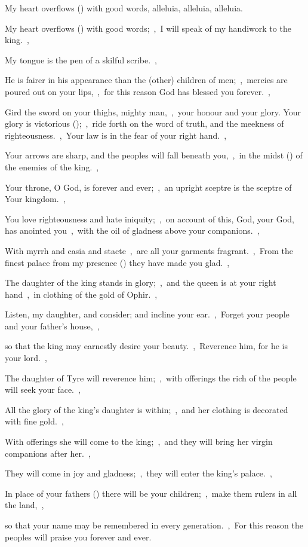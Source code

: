 \documentclass[12pt,twoside,a5paper]{article}
\begin{document}

\begin{halfparskip}
  My heart overflows () with good words, alleluia, alleluia, alleluia.

  My heart overflows () with good words;~\sep\ I will speak of my handiwork to the king.~\sep

  My tongue is the pen of a skilful scribe.~\sep

  He is fairer in his appearance than the (other) children of men;~\sep\ mercies are poured out on your lips,~\sep\ for this reason God has blessed you forever.~\sep

  Gird the sword on your thighs, mighty man,~\sep\ your honour and your glory. Your glory is victorious ();~\sep\ ride forth on the word of truth, and the meekness of righteousness.~\sep\ Your law is in the fear of your right hand.~\sep

  Your arrows are sharp, and the peoples will fall beneath you,~\sep\ in the midst () of the enemies of the king.~\sep

  Your throne, O God, is forever and ever;~\sep\ an upright sceptre is the sceptre of Your kingdom.~\sep

  You love righteousness and hate iniquity;~\sep\ on account of this, God, your God, has anointed you~\sep\ with the oil of gladness above your companions.~\sep

  With myrrh and casia and stacte~\sep\ are all your garments fragrant.~\sep\ From the finest palace from my presence () they have made you glad.~\sep

  The daughter of the king stands in glory;~\sep\ and the queen is at your right hand~\sep\ in clothing of the gold of Ophir.~\sep

  Listen, my daughter, and consider; and incline your ear.~\sep\ Forget your people and your father's house,~\sep

  so that the king may earnestly desire your beauty.~\sep\ Reverence him, for he is your lord.~\sep

  The daughter of Tyre will reverence him;~\sep\ with offerings the rich of the people will seek your face.~\sep

  All the glory of the king's daughter is within;~\sep\ and her clothing is decorated with fine gold.~\sep

  With offerings she will come to the king;~\sep\ and they will bring her virgin companions after her.~\sep

  They will come in joy and gladness;~\sep\ they will enter the king's palace.~\sep

  In place of your fathers () there will be your children;~\sep\ make them rulers in all the land,~\sep

  so that your name may be remembered in every generation.~\sep\ For this reason the peoples will praise you forever and ever.
\end{halfparskip}
\end{document}
